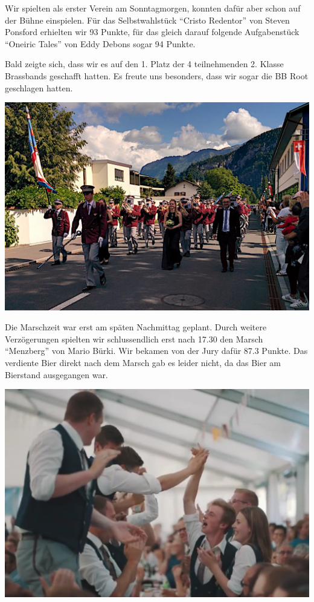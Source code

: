 \begin{history}

    Wir spielten als erster Verein am Sonntagmorgen, konnten dafür aber schon
    auf der Bühne einspielen. Für das Selbstwahlstück \enquote{Cristo Redentor}
    von Steven Ponsford erhielten wir 93 Punkte, für das gleich darauf folgende
    Aufgabenstück \enquote{Oneiric Tales} von Eddy Debons sogar 94 Punkte.

    Bald zeigte sich, dass wir es auf den 1. Platz der 4 teilnehmenden 2. Klasse
    Brassbands geschafft hatten. Es freute uns besonders, dass wir sogar die BB
    Root geschlagen hatten.

    \begin{MulticolFigure}
        \centering
        \includegraphics[width=0.93\linewidth]{./chap/2001-2024/2019/Marschmusik.jpg}
    \end{MulticolFigure}

    Die Marschzeit war erst am späten Nachmittag geplant. Durch weitere
    Verzögerungen spielten wir schlussendlich erst nach 17.30 den Marsch
    \enquote{Menzberg} von Mario Bürki. Wir bekamen von der Jury dafür 87.3
    Punkte. Das verdiente Bier direkt nach dem Marsch gab es leider nicht, da
    das Bier am Bierstand ausgegangen war.

    \begin{MulticolFigure}
        \centering
        \includegraphics[width=0.93\linewidth]{./chap/2001-2024/2019/Siegerjubel.jpg}
    \end{MulticolFigure}


\end{history}

